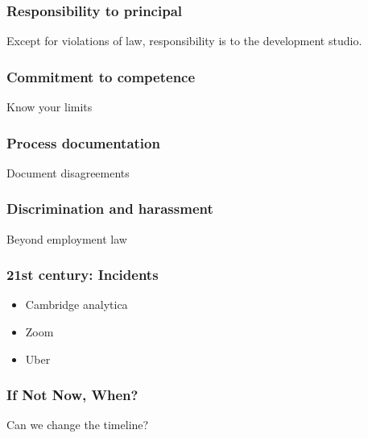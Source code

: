 \begin{frame}[fragile]
\frametitle{Responsibility to principal}

Except for violations of law,
responsibility is to the development studio.

\end{frame}

\begin{frame}[fragile]
\frametitle{Commitment to competence}

Know your limits

\end{frame}

\begin{frame}[fragile]
\frametitle{Process documentation}

Document disagreements

\end{frame}

\begin{frame}[fragile]
\frametitle{Discrimination and harassment}

Beyond employment law

\end{frame}

\begin{frame}[fragile]
\frametitle{21st century: Incidents}

\begin{itemize}
\item Cambridge analytica
\item Zoom
\item Uber
\end{itemize}

\end{frame}

\begin{frame}[fragile]
\frametitle{If Not Now, When?}

Can we change the timeline?

\end{frame}


